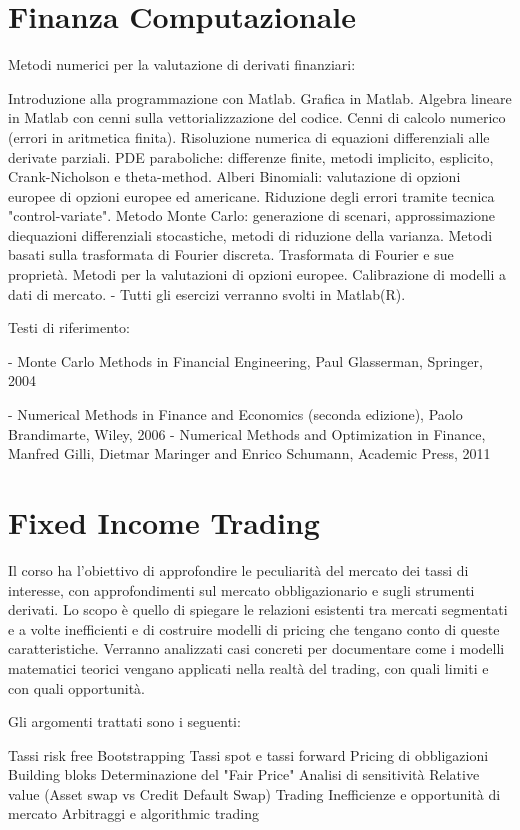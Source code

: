 \section{Finanza Computazionale}
Metodi numerici per la valutazione di derivati finanziari:

Introduzione alla programmazione con Matlab. Grafica in Matlab. Algebra lineare in Matlab con cenni sulla vettorializzazione del codice.
Cenni di calcolo numerico (errori in aritmetica finita).
Risoluzione numerica di equazioni differenziali alle derivate parziali. PDE paraboliche: differenze finite, metodi implicito, esplicito, Crank-Nicholson e theta-method.
Alberi Binomiali: valutazione di opzioni europee di opzioni europee ed americane. Riduzione degli errori tramite tecnica "control-variate".
Metodo Monte Carlo: generazione di scenari, approssimazione diequazioni differenziali stocastiche, metodi di riduzione della varianza.
Metodi basati sulla trasformata di Fourier discreta. Trasformata di Fourier e sue proprietà. Metodi per la valutazioni di opzioni europee.
Calibrazione di modelli a dati di mercato.
- Tutti gli esercizi verranno svolti in Matlab(R).


Testi di riferimento:

- Monte Carlo Methods in Financial Engineering, Paul Glasserman, Springer, 2004

- Numerical Methods in Finance and Economics (seconda edizione), Paolo Brandimarte, Wiley, 2006
- Numerical Methods and Optimization in Finance, Manfred Gilli, Dietmar Maringer and Enrico Schumann, Academic Press, 2011

\section{Fixed Income Trading}
Il corso ha l'obiettivo di approfondire le peculiarità del mercato dei tassi di interesse, con approfondimenti sul mercato obbligazionario e sugli strumenti derivati. Lo scopo è quello di spiegare le relazioni esistenti tra mercati segmentati e a volte inefficienti e di costruire modelli di pricing che tengano conto di queste caratteristiche. Verranno analizzati casi concreti per documentare come i modelli matematici teorici vengano applicati nella realtà del trading, con quali limiti e con quali opportunità.

Gli argomenti trattati sono i seguenti:

Tassi risk free
Bootstrapping
Tassi spot e tassi forward
Pricing di obbligazioni
Building bloks
Determinazione del "Fair Price"
Analisi di sensitività
Relative value (Asset swap vs Credit Default Swap)
Trading
Inefficienze e opportunità di mercato
Arbitraggi e algorithmic trading

